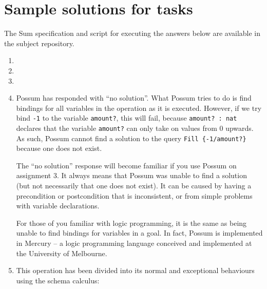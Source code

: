 \documentclass{article}
\def\rootdir{..}
\begin{document}
%

\lstset{language=}
\section*{Sample solutions for tasks}

The Sum specification and script for executing the answers below are available in the subject repository.

\begin{enumerate}

 \item


 \item 


 \item 


 \item 


Possum has responded with ``no solution''. What Possum tries to do is find bindings for all variables in the operation as it is executed. However, if we try bind \texttt{-1} to the variable \texttt{amount?}, this will fail, because \texttt{amount? : nat} declares that the variable \texttt{amount?} can only take on values from 0 upwards. As such, Possum cannot find a solution to the query \texttt{Fill \{-1/amount?\}} because one does not exist.

The ``no solution'' response will become familiar if you use Possum on assignment 3. It always means that Possum was unable to find a solution (but not necessarily that one does not exist). It can be caused by having a precondition or postcondition that is inconsistent, or from simple problems with variable declarations.

For those of you familiar with logic programming, it is the same as being unable to find bindings for variables in a goal. In fact, Possum is implemented in Mercury -- a logic programming language conceived and implemented at the University of Melbourne.
 
 \item This operation has been divided into its normal and exceptional behaviours using the schema calculus:


\end{enumerate}
\end{document}
